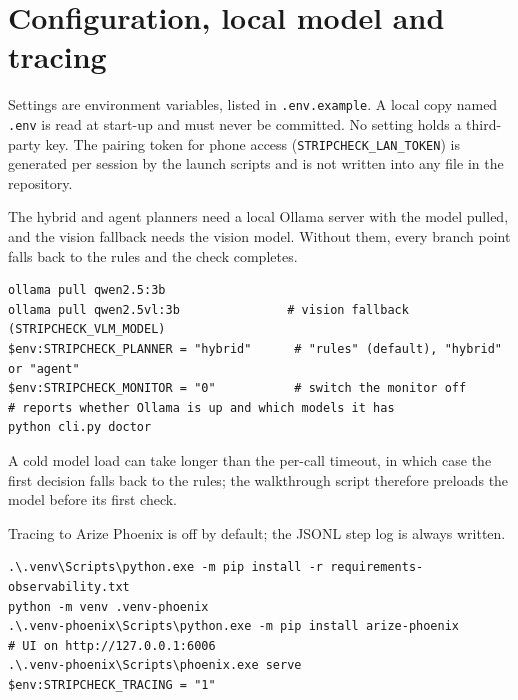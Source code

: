 \section{Configuration, local model and tracing}
\label{sec:app-run-optional}

Settings are environment variables, listed in \texttt{.env.example}. A local copy named \texttt{.env} is read at start-up and must never be committed. No setting holds a third-party key. The pairing token for phone access (\texttt{STRIPCHECK\_LAN\_TOKEN}) is generated per session by the launch scripts and is not written into any file in the repository.

The hybrid and agent planners need a local Ollama server with the model pulled, and the vision fallback needs the vision model. Without them, every branch point falls back to the rules and the check completes.
\par\smallskip\noindent\begin{minipage}[t]{\linewidth}\vspace{-\topsep}\begin{lstlisting}[language={},numbers=none,breakatwhitespace=true]
ollama pull qwen2.5:3b
ollama pull qwen2.5vl:3b               # vision fallback (STRIPCHECK_VLM_MODEL)
$env:STRIPCHECK_PLANNER = "hybrid"      # "rules" (default), "hybrid" or "agent"
$env:STRIPCHECK_MONITOR = "0"           # switch the monitor off
# reports whether Ollama is up and which models it has
python cli.py doctor
\end{lstlisting}\end{minipage}\par\smallskip\noindent
A cold model load can take longer than the per-call timeout, in which case the first decision falls back to the rules; the walkthrough script therefore preloads the model before its first check.

Tracing to Arize Phoenix is off by default; the JSONL step log is always written.
\par\smallskip\noindent\begin{minipage}[t]{\linewidth}\vspace{-\topsep}\begin{lstlisting}[language={},numbers=none,breakatwhitespace=true]
.\.venv\Scripts\python.exe -m pip install -r requirements-observability.txt
python -m venv .venv-phoenix
.\.venv-phoenix\Scripts\python.exe -m pip install arize-phoenix
# UI on http://127.0.0.1:6006
.\.venv-phoenix\Scripts\phoenix.exe serve
$env:STRIPCHECK_TRACING = "1"
\end{lstlisting}\end{minipage}\par\smallskip\noindent

